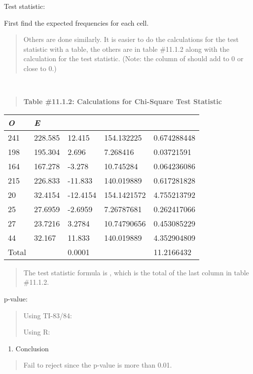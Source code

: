 \documentclass[]{book}
\providecommand{\tightlist}{%
  \setlength{\itemsep}{0pt}\setlength{\parskip}{0pt}}
\begin{document}
Test statistic:

First find the expected frequencies for each cell.

\begin{quote}
Others are done similarly. It is easier to do the calculations for the test statistic with a table, the others are in table \#11.1.2 along with the calculation for the test statistic. (Note: the column of should add to 0 or close to 0.)
\end{quote}

\textbf{\\
}

\begin{quote}
\textbf{Table \#11.1.2: Calculations for Chi-Square Test Statistic}
\end{quote}

\begin{longtable}[]{@{}lllll@{}}
\toprule
\emph{O} & \emph{E} & & &\tabularnewline
\midrule
\endhead
241 & 228.585 & 12.415 & 154.132225 & 0.674288448\tabularnewline
198 & 195.304 & 2.696 & 7.268416 & 0.03721591\tabularnewline
164 & 167.278 & -3.278 & 10.745284 & 0.064236086\tabularnewline
215 & 226.833 & -11.833 & 140.019889 & 0.617281828\tabularnewline
20 & 32.4154 & -12.4154 & 154.1421572 & 4.755213792\tabularnewline
25 & 27.6959 & -2.6959 & 7.26787681 & 0.262417066\tabularnewline
27 & 23.7216 & 3.2784 & 10.74790656 & 0.453085229\tabularnewline
44 & 32.167 & 11.833 & 140.019889 & 4.352904809\tabularnewline
Total & & 0.0001 & & 11.2166432\tabularnewline
\bottomrule
\end{longtable}

\begin{quote}
The test statistic formula is , which is the total of the last column in table \#11.1.2.
\end{quote}

p-value:

\begin{quote}
Using TI-83/84:

Using R:
\end{quote}

\begin{enumerate}
\def\labelenumi{\arabic{enumi}.}
\setcounter{enumi}{3}
\tightlist
\item
  Conclusion
\end{enumerate}

\begin{quote}
Fail to reject since the p-value is more than 0.01.
\end{quote}
\end{document}
